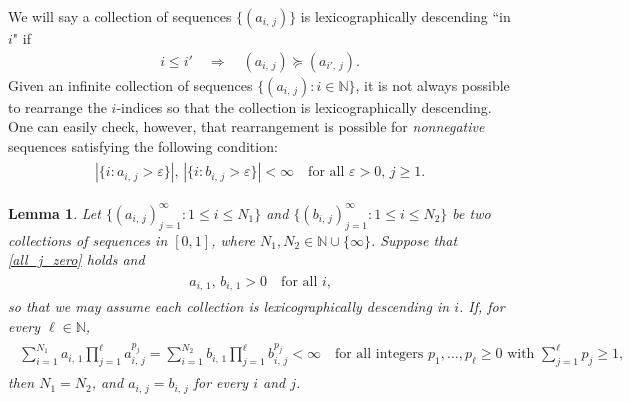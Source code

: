 \documentclass[11pt,reqno]{amsart}
\numberwithin{equation}{section}
\newtheorem{lemma}[thm]{Lemma}
\theoremstyle{definition}
\begin{document}
We will say a collection of sequences $\{(a_{i,\, j})\}$ is lexicographically descending ``in $i$" if
{\begin{align*} {
i \leq i' \quad \Rightarrow \quad (a_{i,\, j}) \succeq (a_{i',\, j}).
} \end{align*}}
Given an infinite collection of sequences $\{(a_{i,\, j}) : i \in {\mathbb{N}}\}$, it is not always possible to rearrange the $i$-indices so that the collection is lexicographically descending.
One can easily check, however, that rearrangement  is possible for \textit{nonnegative} sequences satisfying the following condition:
{\begin{align} \begin{split} {
|\{i : a_{i,\, j} > {\varepsilon}\}|,\,  |\{i : b_{i,\, j} > {\varepsilon}\}| < \infty \quad \text{for all ${\varepsilon} > 0$, $j \geq 1$.} \label{all_j_zero}
} \end{split} \end{align}}

\begin{lemma} \label{powers_lemma}
Let $\{(a_{i,\, j})_{j = 1}^\infty : 1 \leq i \leq N_1\}$ and $\{(b_{i,\, j})_{j = 1}^\infty : 1 \leq i \leq N_2\}$ be two collections of sequences in $[0,1]$, where $N_1,N_2 \in {\mathbb{N}} \cup \{\infty\}$.
Suppose that \eqref{all_j_zero} holds and
{\begin{align} \begin{split} {
a_{i,\, 1},\, b_{i,\, 1} > 0 \quad \text{for all $i$,} \label{first_terms_pos}
} \end{split} \end{align}}
so that we may assume each collection is lexicographically descending in $i$.
If, for every $\ell \in {\mathbb{N}}$,
{\begin{align} \begin{split} {
\sum_{i = 1}^{N_1} a_{i,\, 1}\prod_{j = 1}^\ell a_{i,\, j}^{p_j} = \sum_{i = 1}^{N_2} b_{i,\, 1}\prod_{j = 1}^\ell b_{i,\, j}^{p_j} < \infty 
\quad \text{for all integers $p_1,\dots,p_\ell \geq 0$ with $\sum_{j=1}^\ell p_j \geq 1$,} \label{tests_agree}
} \end{split} \end{align}}
then $N_1 = N_2$, and $a_{i,\, j} = b_{i,\, j}$ for every $i$ and $j$.
\end{lemma}
\end{document}
